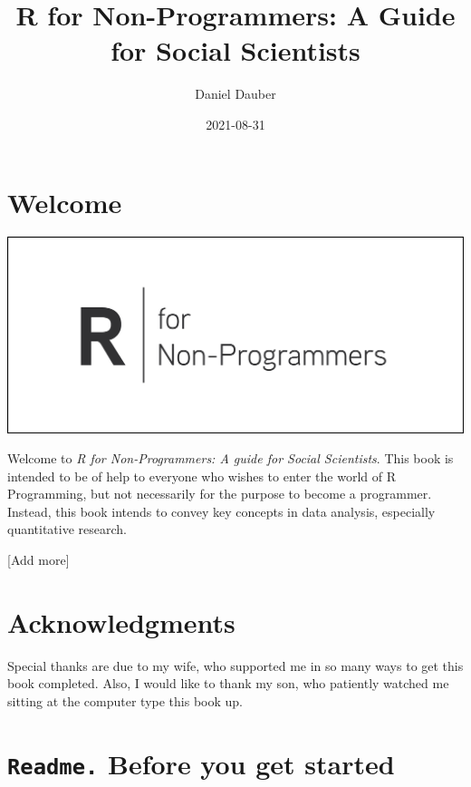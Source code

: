 \documentclass[
]{book}
\title{R for Non-Programmers: A Guide for Social Scientists}
\author{Daniel Dauber}
\date{2021-08-31}
\begin{document}
\maketitle

{
\setcounter{tocdepth}{1}
\tableofcontents
}
\hypertarget{welcome}{%
\chapter*{Welcome 👋}\label{welcome}}

\includegraphics{images/chapter_00_img/r_for_non_programmers_logo.png}

Welcome to \emph{R for Non-Programmers: A guide for Social Scientists}. This book is intended to be of help to everyone who wishes to enter the world of R Programming, but not necessarily for the purpose to become a programmer. Instead, this book intends to convey key concepts in data analysis, especially quantitative research.

{[}Add more{]}

\hypertarget{acknowledgments}{%
\chapter*{Acknowledgments 🙏}\label{acknowledgments}}

Special thanks are due to my wife, who supported me in so many ways to get this book completed. Also, I would like to thank my son, who patiently watched me sitting at the computer type this book up.

\hypertarget{readme-before-you-get-started}{%
\chapter{\texorpdfstring{\texttt{Readme.} Before you get started}{Readme. Before you get started}}\label{readme-before-you-get-started}}
\end{document}
